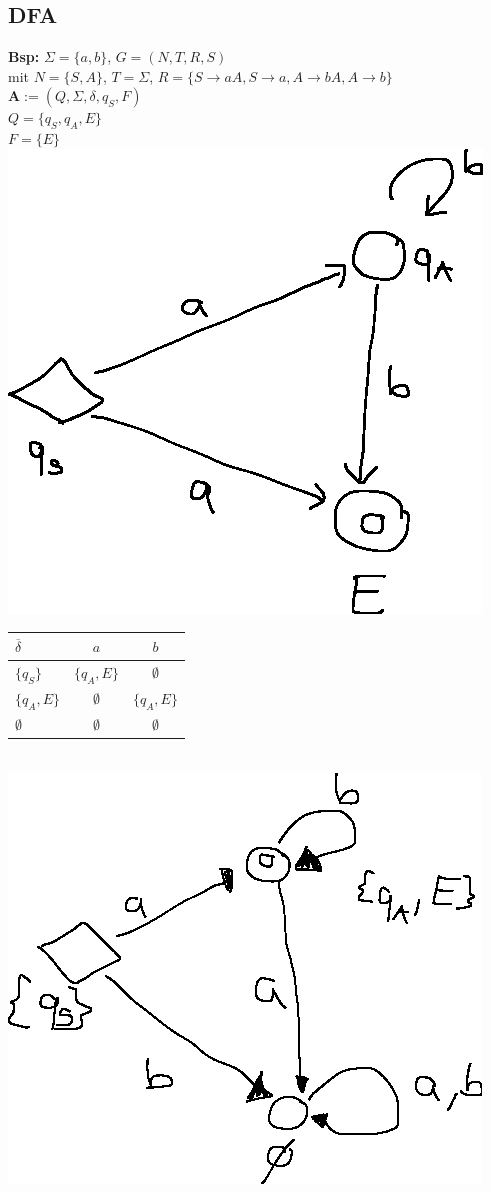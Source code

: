 \documentclass[10pt]{article}
\newcommand{\Bold}[1]{\textbf{#1}} %
\begin{document}
\subsection{DFA}
\Bold{Bsp:} $\Sigma=\{a,b\}$, $G=(N,T,R,S)$\\
mit $N=\{S,A\}$, $T=\Sigma$, $R=\{S\to aA,S\to a,A\to bA, A\to b\}$\\
$\Bold{A}:=(Q,\Sigma,\delta,q_S,F)$\\
$Q=\{q_S,q_A,E\}$\\
$F=\{E\}$\\
\includegraphics{Bild7.eps}\\
\begin{tabular}{l|c|c}
 $\overline{\delta}$&$a$&$b$\\\hline
 $\{q_S\}$&$\{q_A,E\}$&$\emptyset$\\
 $\{q_A,E\}$&$\emptyset$&$\{q_A,E\}$\\
 $\emptyset$&$\emptyset$&$\emptyset$\\
\end{tabular}\\
\includegraphics{Bild8.eps}\\
\end{document}
